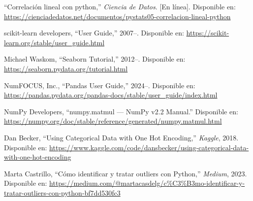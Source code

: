 \documentclass[conference]{IEEEtran}
\begin{document}
\renewcommand{\refname}{}
\vspace{-1em}%
\begin{thebibliography}{00}

``Correlaci\'on lineal con python,'' \emph{Ciencia de Datos}. [En l\'inea]. Disponible en: \url{https://cienciadedatos.net/documentos/pystats05-correlacion-lineal-python}

scikit\mbox{-}learn developers, ``User Guide,'' 2007--. Disponible en: \url{https://scikit-learn.org/stable/user_guide.html}

Michael Waskom, ``Seaborn Tutorial,'' 2012--. Disponible en: \url{https://seaborn.pydata.org/tutorial.html}

NumFOCUS, Inc., ``Pandas User Guide,'' 2024--. Disponible en: \url{https://pandas.pydata.org/pandas-docs/stable/user_guide/index.html}

NumPy Developers, ``numpy.matmul --- NumPy v2.2 Manual.'' Disponible en: \url{https://numpy.org/doc/stable/reference/generated/numpy.matmul.html}

Dan Becker, ``Using Categorical Data with One Hot Encoding,'' \emph{Kaggle}, 2018. Disponible en: \url{https://www.kaggle.com/code/dansbecker/using-categorical-data-with-one-hot-encoding}

Marta Castrillo, ``C\'omo identificar y tratar outliers con Python,'' \emph{Medium}, 2023. Disponible en: \url{https://medium.com/@martacasdelg/c%C3%B3mo-identificar-y-tratar-outliers-con-python-bf7dd530fc3}

\end{thebibliography}
\end{document}
